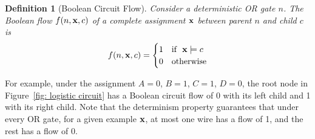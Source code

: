 \documentclass[letterpaper]{article} %
\newtheorem{definition}{Definition}
\begin{document}
\begin{definition}[Boolean Circuit Flow]
\label{definition: circuit flow}
Consider a deterministic OR gate $n$.
The Boolean flow $f(n,{\bf x},c)$ of a complete assignment $\bf x$ between parent $n$ and child $c$ is
\begin{align*}
    f(n,{\bf x},c) = \begin{cases}
    1 &\mbox{if~~} {\bf x} \models c \\
    0 & \mbox{otherwise}
    \end{cases}
\end{align*}
\end{definition}
For example, under the assignment $A=0$, $B=1$, $C=1$, $D=0$, the root node in Figure~\ref{fig: logistic circuit} has a Boolean circuit flow of 0 with its left child and 1 with its right child.
Note that the determinism property guarantees that under every OR gate, for a given example ${\bf x}$, at most one wire has a flow of 1, and the rest has a flow of $0$.
\end{document}
